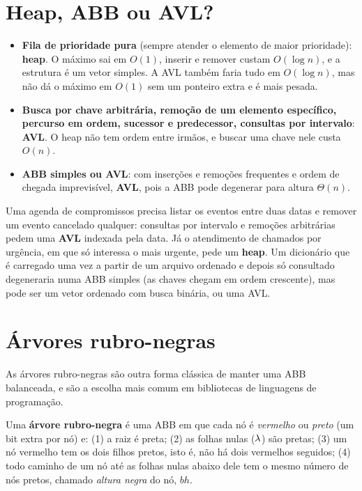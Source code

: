 \section{Heap, ABB ou AVL?}\label{sec:avlescolha}
\begin{roteiro}
\begin{itemize}
  \item \textbf{Fila de prioridade pura} (sempre atender o elemento de maior prioridade): \textbf{heap}. O máximo sai em $O(1)$, inserir e remover custam $O(\log n)$, e a estrutura é um vetor simples. A AVL também faria tudo em $O(\log n)$, mas não dá o máximo em $O(1)$ sem um ponteiro extra e é mais pesada.
  \item \textbf{Busca por chave arbitrária, remoção de um elemento específico, percurso em ordem, sucessor e predecessor, consultas por intervalo}: \textbf{AVL}. O heap não tem ordem entre irmãos, e buscar uma chave nele custa $O(n)$.
  \item \textbf{ABB simples ou AVL}: com inserções e remoções frequentes e ordem de chegada imprevisível, \textbf{AVL}, pois a ABB pode degenerar para altura $\Theta(n)$.
\end{itemize}
\end{roteiro}

\begin{exemplo}
Uma agenda de compromissos precisa listar os eventos entre duas datas e remover um evento cancelado qualquer: consultas por intervalo e remoções arbitrárias pedem uma \textbf{AVL} indexada pela data. Já o atendimento de chamados por urgência, em que só interessa o mais urgente, pede um \textbf{heap}. Um dicionário que é carregado uma vez a partir de um arquivo ordenado e depois só consultado degeneraria numa ABB simples (as chaves chegam em ordem crescente), mas pode ser um vetor ordenado com busca binária, ou uma AVL.
\end{exemplo}

\section{Árvores rubro-negras}\label{sec:rn}
As árvores rubro-negras são outra forma clássica de manter uma ABB balanceada, e são a escolha mais comum em bibliotecas de linguagens de programação.
\begin{defi}
Uma \textbf{árvore rubro-negra} é uma ABB em que cada nó é \emph{vermelho} ou \emph{preto} (um bit extra por nó) e: (1) a raiz é preta; (2) as folhas nulas ($\lambda$) são pretas; (3) um nó vermelho tem os dois filhos pretos, isto é, não há dois vermelhos seguidos; (4) todo caminho de um nó até as folhas nulas abaixo dele tem o mesmo número de nós pretos, chamado \emph{altura negra} do nó, $bh$.
\end{defi}

